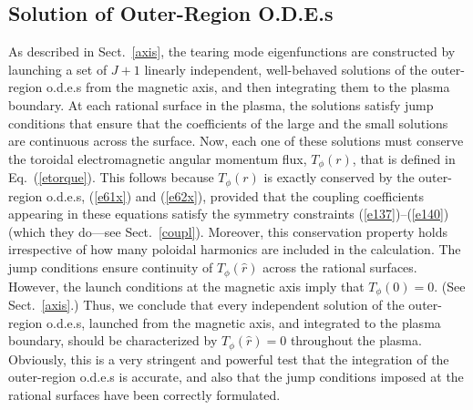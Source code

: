 \documentclass[12pt,prb,aps]{revtex4-1}
\begin{document}
\subsection{Solution of Outer-Region O.D.E.s}
 As described in Sect.~\ref{axis}, the tearing mode eigenfunctions are constructed by launching a
 set of $J+1$ linearly independent, well-behaved solutions of the outer-region o.d.e.s from  the magnetic axis, and then integrating them to the plasma
 boundary. At each rational surface in the plasma, the solutions satisfy   jump conditions  that ensure that the
 coefficients of the large and the small solutions are continuous across the surface. Now,
 each one of these solutions must conserve the toroidal electromagnetic angular momentum flux, $T_\phi(r)$,
 that is defined in Eq.~(\ref{etorque}). This follows because $T_\phi(r)$ is exactly conserved by the outer-region o.d.e.s, (\ref{e61x})
 and (\ref{e62x}), provided that the coupling coefficients appearing in these equations satisfy the symmetry constraints (\ref{e137})--(\ref{e140})
 (which they do---see Sect.~\ref{coupl}). Moreover, this conservation property holds irrespective of how many poloidal harmonics are included in the calculation. The
 jump conditions ensure continuity of $T_\phi(\hat{r})$ across the rational surfaces. However, the launch conditions at the
 magnetic axis imply that $T_\phi(0)=0$. (See Sect.~\ref{axis}.) Thus, we conclude that every independent solution of the outer-region o.d.e.s, launched
 from the magnetic axis, and integrated to the plasma boundary, should be characterized by $T_\phi(\hat{r})=0$ throughout the plasma. 
 Obviously, this is a very stringent and powerful test that the integration of the outer-region o.d.e.s is accurate, and also
 that the jump conditions imposed at the rational surfaces have been correctly formulated. 
 
\end{document}
